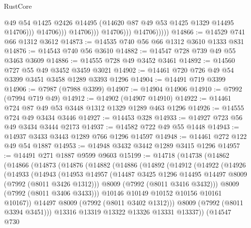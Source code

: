 \begin{lexlean}{RustCore}
\begin{coremodule}
                                    @49
                                    @54
                                    @1425
                                    @2426
                                    @14495
                                    (@14620 @87 @49 @53 @1425 @1329 @14495 @14706)))
                                @14706)))
                          @14706)))
                    @14706)))
              @14706)))))
@14866 := @14529 @741 @66 @1312 @3612
@14873 := @14535 @740 @56 @66 @1312 @3610 @1333 @831
@14876 := @14543 @740 @56 @3610
@14882 := @14547 @728 @739 @49 @55 @3463 @3609
@14886 := @14555 @728 @49 @3452 @3461
@14892 := @14560 @727 @55 @49 @3452 @3459 @3021
@14902 := @14461 @720 @726 @49 @54 @3399 @3451 @3458 @1289 @3393 @1296
@14904 := @14491 @719 @3399
@14906 := @7987 (@7988 @3399)
@14907 := @14904 @14906
@14910 := @7992 (@7994 @719 @49)
@14912 := @14902 (@14907 @14910)
@14922 := @14461 @724 @87 @49 @53 @3448 @1312 @1329 @1289 @463 @1296
@14926 := @14555 @724 @49 @3434 @3446
@14927 := @14453 @328
@14933 := @14927 @723 @56 @49 @3434 @3444 @2173
@14937 := @14582 @722 @49 @55 @1448
@14943 := @14937 @3433 @3443 @1289 @766 @1296 @14597
@14948 := @14461 @272 @122 @49 @54 @1887
@14953 := @14948 @3432 @3442 @1289 @3415 @1296
@14957 := @14491 @271 @1887 @9599 @9603
@15199 := @14718
    (@14738
      (@14862
        (@14866
          (@14873
            (@14876
              (@14882
                (@14886
                  (@14892
                    (@14912
                      (@14922
                        (@14926
                          (@14933
                            (@14943
                              (@14953
                                @14957
                                (@14487 @3425 @1296 @14495 @14497 @8009 (@7992 (@8011 @3426 @1312)))
                                @8009
                                (@7992 (@8011 @3416 @3432)))
                              @8009
                              (@7992 (@8011 @3406 @3433)))
                            @10146
                            @10149
                            @10152
                            @10156
                            @10161
                            @10167))
                        @14497
                        @8009
                        (@7992 (@8011 @3402 @1312)))
                      @8009
                      (@7992 (@8011 @3394 @3451)))
                    @13316
                    @13319
                    @13322
                    @13326
                    @13331
                    @13337))
                (@14547
                  @730

\end{coremodule}
\end{lexlean}

